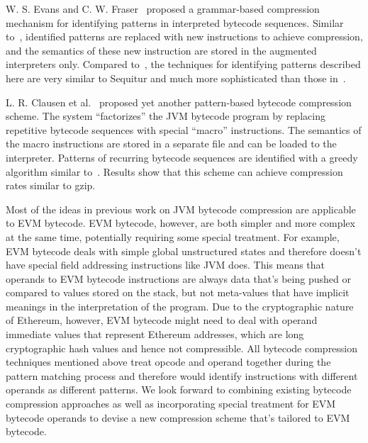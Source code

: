 W. S. Evans and C. W. Fraser~\cite{evans2003} proposed a grammar-based compression mechanism for identifying patterns in
interpreted bytecode sequences.
Similar to~\cite{aslam2010}, identified patterns are replaced with new instructions to achieve compression, and the semantics
of these new instruction are stored in the augmented interpreters only. Compared to~\cite{aslam2010}, the techniques for
identifying patterns described here are very similar to Sequitur and much more sophisticated than those in~\cite{aslam2010}.

L. R. Clausen et al.~\cite{clausen2000} proposed yet another pattern-based bytecode compression scheme. The system ``factorizes''
the JVM bytecode program by replacing repetitive bytecode sequences with special ``macro'' instructions. The semantics of the
macro instructions are stored in a separate file and can be loaded to the interpreter. Patterns of recurring bytecode sequences
are identified with a greedy algorithm similar to~\cite{aslam2010}. Results show that this scheme can achieve compression rates
similar to gzip.

Most of the ideas in previous work on JVM bytecode compression are applicable to EVM bytecode. EVM bytecode, however, are
both simpler and more complex at the same time, potentially requiring some special treatment. For example, EVM bytecode deals
with simple global unstructured states and therefore doesn't have special field addressing instructions like JVM does.
This means that operands to EVM bytecode instructions are always data that's being pushed or compared to values stored on
the stack, but not meta-values that have implicit meanings in the interpretation of the program.
Due to the cryptographic nature of Ethereum, however, EVM bytecode might need to deal with operand immediate values that
represent Ethereum addresses, which are long cryptographic hash values and hence not compressible. All bytecode compression
techniques mentioned above treat opcode and operand together during the pattern matching process and therefore would identify
instructions with different operands as different patterns.
We look forward to combining existing bytecode compression approaches as well as incorporating special treatment for EVM
bytecode operands to devise a new compression scheme that's tailored to EVM bytecode.
